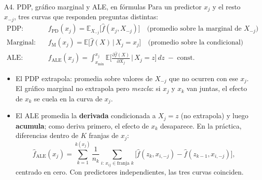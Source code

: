 \documentclass{beamer}
\newcommand{\E}{\mathbb{E}}
\newcommand{\1}{\mathbb{I}}
\begin{document}
\begin{frame}{A4. PDP, gráfico marginal y ALE, en fórmulas}
\small
Para un predictor $x_j$ y el resto $x_{-j}$, tres curvas que responden preguntas distintas:
\begin{align*}
\text{PDP:} \quad & f_{\text{PD}}(x_j) = \E_{X_{-j}}\big[\hat{f}(x_j, X_{-j})\big] \quad \text{(promedio sobre la marginal de } X_{-j}\text{)} \\[2pt]
\text{Marginal:} \quad & f_{\text{M}}(x_j) = \E\big[\hat{f}(X) \,\big|\, X_j = x_j\big] \quad \text{(promedio sobre la condicional)} \\[2pt]
\text{ALE:} \quad & f_{\text{ALE}}(x_j) = \int_{x_{\min}}^{x_j} \E\Big[ \frac{\partial \hat{f}(X)}{\partial X_j} \,\Big|\, X_j = z \Big]\, dz \;-\; \text{const.}
\end{align*}
\pause
\begin{itemize}\itemsep1pt
  \item El PDP extrapola: promedia sobre valores de $X_{-j}$ que no ocurren con ese $x_j$. El gráfico marginal no extrapola pero \emph{mezcla}: si $x_j$ y $x_k$ van juntas, el efecto de $x_k$ se cuela en la curva de $x_j$.
  \item El ALE promedia la \textbf{derivada} condicionada a $X_j = z$ (no extrapola) y luego \textbf{acumula}; como deriva primero, el efecto de $x_k$ desaparece. En la práctica, diferencias dentro de $K$ franjas de $x_j$:
  \[ \hat{f}_{\text{ALE}}(x_j) = \sum_{k=1}^{k(x_j)} \frac{1}{n_k} \sum_{i:\, x_{ij} \in \text{franja } k} \Big[ \hat{f}(z_k, x_{i,-j}) - \hat{f}(z_{k-1}, x_{i,-j}) \Big], \]
  centrado en cero. Con predictores independientes, las tres curvas coinciden.
\end{itemize}
\end{frame}
\end{document}

